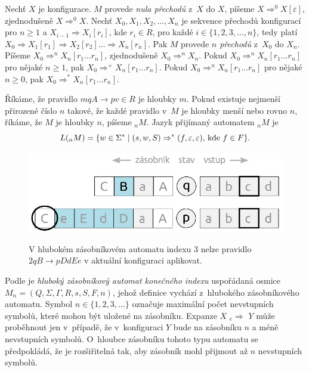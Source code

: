 \begin{Def}
Nechť $X$ je konfigurace. $M$ provede \emph{nula přechodů} z~$X$ do $X$, píšeme $X \Rightarrow^0 X [\varepsilon]$, zjednodušeně $X \Rightarrow^0 X$. Nechť $X_0, X_1, X_2,\dots,X_n $ je sekvence přechodů konfigurací pro $n \ge 1$  a $X_{i-1} \Rightarrow X_i [r_i]$, kde $r_i \in R$, pro každé $i \in \{1, 2, 3,\dots, n\}$, tedy platí $X_0 \Rightarrow X_1 [r_1] \Rightarrow X_2 [r_2] \dots \Rightarrow X_n [r_n]$. Pak $M$ provede \emph{$n$ přechodů} z~$X_0$ do $X_n$. Píšeme $X_{0} \Rightarrow^n X_n [r_1 \dots r_n]$, zjednodušeně $X_{0} \Rightarrow^n X_n$. Pokud $X_{0} \Rightarrow^n X_n [r_1 \dots r_n]$ pro nějaké $n \ge 1$, pak $X_{0} \Rightarrow^+ X_n [r_1 \dots r_n]$. Pokud $X_{0} \Rightarrow^n X_n [r_1 \dots r_n]$ pro nějaké $n \ge 0$, pak $X_{0} \Rightarrow^* X_n [r_1 \dots r_n]$.

Říkáme, že pravidlo $mqA \rightarrow pv \in R$ je hloubky $m$. Pokud existuje nejmenší přirozené číslo $n$ takové, že každé pravidlo v~$M$ je hloubky menší nebo rovno $n$, říkáme, že $M$ je hloubky $n$, píšeme ${}_nM$. Jazyk přijímaný automatem ${}_nM$ je
    $$L({}_nM) = \{ w \in \Sigma^* \mid (s,w,S) \Rightarrow^* (f, \varepsilon, \varepsilon)\textnormal{, kde }f \in F \}.$$


\end{Def}

\begin{figure}[ht]
\centering
\includegraphics{img/bp_pda02.eps} \bigskip \\
\caption{V hlubokém zásobníkovém automatu indexu 3 nelze pravidlo $2 q B \rightarrow p DdEe$ v aktuální konfiguraci aplikovat.}
\end{figure}


\begin{Def} Podle \cite{Meduna:FinitelyDeepPDA} je \emph{hluboký zásobníkový automat konečného indexu} uspořádaná osmice $M_n = (Q,\Sigma,\Gamma, R, s, S, F, n)$, jehož definice vychází z~hlubokého zásobníkového automatu. Symbol $n \in \{1,2,3,\dots\}$ označuje maximální počet nevstupních symbolů, které mohou být uložené na zásobníku. Expanze $X$  ${}_e{\Rightarrow}$  $Y$ může proběhnout jen v~případě, že v~konfiguraci $Y$ bude na zásobníku $n$ a méně nevstupních symbolů.  O~hloubce zásobníku tohoto typu automatu se předpokládá, že je rozšiřitelná tak, aby zásobník mohl přijmout až $n$ nevstupních symbolů.


\end{Def}

